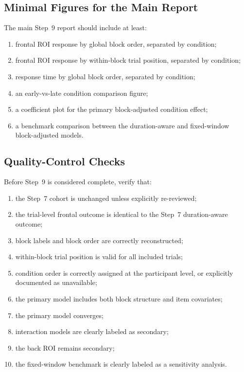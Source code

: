 \subsection{Minimal Figures for the Main Report}
The main Step~9 report should include at least:
\begin{enumerate}
    \item frontal ROI response by global block order, separated by condition;
    \item frontal ROI response by within-block trial position, separated by condition;
    \item response time by global block order, separated by condition;
    \item an early-vs-late condition comparison figure;
    \item a coefficient plot for the primary block-adjusted condition effect;
    \item a benchmark comparison between the duration-aware and fixed-window block-adjusted models.
\end{enumerate}

\subsection{Quality-Control Checks}
Before Step~9 is considered complete, verify that:
\begin{enumerate}
    \item the Step~7 cohort is unchanged unless explicitly re-reviewed;
    \item the trial-level frontal outcome is identical to the Step~7 duration-aware outcome;
    \item block labels and block order are correctly reconstructed;
    \item within-block trial position is valid for all included trials;
    \item condition order is correctly assigned at the participant level, or explicitly documented as unavailable;
    \item the primary model includes both block structure and item covariates;
    \item the primary model converges;
    \item interaction models are clearly labeled as secondary;
    \item the back ROI remains secondary;
    \item the fixed-window benchmark is clearly labeled as a sensitivity analysis.
\end{enumerate}

